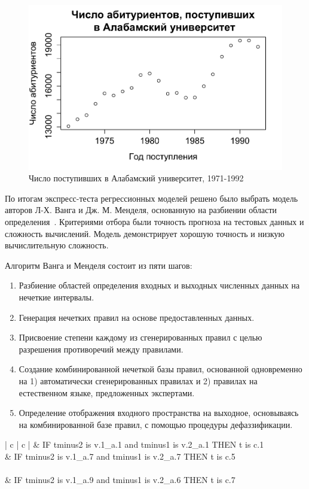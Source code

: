 \begin{figure}[bhtp]
    \includegraphics{images/UA_enrollments.pdf}
    \caption{Число поступивших в Алабамский университет, 1971-1992}		
    \label{figure:UA_enrollments}
\end{figure}

По итогам экспресс-теста регрессионных моделей решено было выбрать модель
авторов Л-Х. Ванга и Дж. М. Менделя, основанную на разбиении области
определения~\cite{Wang1992}. Критериями отбора были точность прогноза на
тестовых данных и сложность вычислений. Модель демонстрирует хорошую точность и
низкую вычислительную сложность. 

Алгоритм Ванга и Менделя состоит из пяти шагов:
\begin{enumerate}
	\item Разбиение областей определения входных и выходных численных данных на нечеткие интервалы.
	\item Генерация нечетких правил на основе предоставленных данных.
	\item Присвоение степени каждому из сгенерированных правил с целью разрешения противоречий между правилами.
	\item Создание комбинированной нечеткой базы правил, основанной одновременно на 1) автоматически сгенерированных правилах и
	   2) правилах на естественном языке, предложенных экспертами.
	
	\item Определение отображения входного пространства на выходное, основываясь на комбинированной базе правил, с помощью процедуры дефаззификации.
\end{enumerate}

\begin{table}[bhtp]
	\caption{Пример нечетких правил}
		\begin{tabular}{ | c | c | }
			 & IF tminus2 is  v.1\_a.1 and tminus1 is  v.2\_a.1 THEN   t  is  c.1 \\
			 & IF tminus2 is  v.1\_a.7 and tminus1 is  v.2\_a.7 THEN   t  is  c.5  \\
			\hline
			 \\
			 & IF tminus2 is  v.1\_a.9 and tminus1 is  v.2\_a.6 THEN   t  is  c.7 \\
			\hline
		\end{tabular}		
	\label{table:fuzzy_rules_example}	
\end{table}

